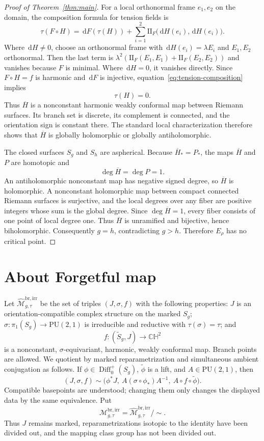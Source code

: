 \documentclass[12pt]{amsart}
\theoremstyle{remark}
\newcommand{\CH}{\mathbb{CH}}
\newcommand{\PU}{\mathrm{PU}}
\newcommand{\II}{\mathrm{II}}
\newcommand{\dd}{\,\mathrm d}
\begin{document}
\begin{proof}[Proof of Theorem~\ref{thm:main}]
For a local orthonormal frame $e_1,e_2$ on the domain, the composition
formula for tension fields is
\begin{equation}\label{eq:tension-composition}
 \tau(F\circ H)=\dd F(\tau(H))+
 \sum_{i=1}^2\II_F\bigl(\dd H(e_i),\dd H(e_i)\bigr).
\end{equation}
Where $\dd H\ne0$, choose an orthonormal frame with
$\dd H(e_i)=\lambda E_i$ and $E_1,E_2$ orthonormal.  Then the last term is
$\lambda^2(\II_F(E_1,E_1)+\II_F(E_2,E_2))$ and vanishes because $F$ is
minimal.  Where $\dd H=0$, it vanishes directly.  Since $F\circ H=f$ is
harmonic and $\dd F$ is injective, equation~\eqref{eq:tension-composition}
implies
\[
 \tau(H)=0.
\]
Thus $\overline H$ is a nonconstant harmonic weakly conformal map between
Riemann surfaces.  Its branch set is discrete, its complement is connected,
and the orientation sign is constant there.  The standard local
characterization therefore shows that $\overline H$ is globally holomorphic
or globally antiholomorphic.

The closed surfaces $S_g$ and $S_h$ are aspherical.  Because
$\overline H_*=P_*$, the maps $\overline H$ and $P$ are homotopic and
\[
 \deg\overline H=\deg P=1.
\]
An antiholomorphic nonconstant map has negative signed degree, so
$\overline H$ is holomorphic.  A nonconstant holomorphic map between compact
connected Riemann surfaces is surjective, and the local degrees over any
fiber are positive integers whose sum is the global degree.  Since
$\deg\overline H=1$, every fiber consists of one point of local degree one.
Thus $\overline H$ is unramified and bijective, hence biholomorphic.
Consequently $g=h$, contradicting $g>h$.  Therefore $E_\rho$ has no critical
point.
\end{proof}

\section{About Forgetful map}\label{rem:fractional-warning}
Let
$\widehat{\mathcal M}^{\mathrm{br,irr}}_{g,\tau}$ be the set of triples
$(J,\sigma,f)$ with the following properties: $J$ is an
orientation-compatible complex structure on the marked $S_g$;
$\sigma:\pi_1(S_g)\to\PU(2,1)$ is irreducible and reductive with
$\tau(\sigma)=\tau$; and
\[
 f:(\widetilde S_g,J)\longrightarrow\CH^2
\]
is a nonconstant, $\sigma$-equivariant, harmonic, weakly conformal map.
Branch points are allowed.  We quotient by marked reparametrization and
simultaneous ambient conjugation as follows.  If
$\phi\in\operatorname{Diff}_0^+(S_g)$, $\widetilde\phi$ is a lift, and
$A\in\PU(2,1)$, then
\begin{equation}\label{eq:minimal-moduli-equivalence}
 (J,\sigma,f)\sim
 \bigl(\phi^*J,\ A(\sigma\circ\phi_*)A^{-1},\
 A\circ f\circ\widetilde\phi\bigr).
\end{equation}
Compatible basepoints are understood; changing them only changes the displayed
data by the same equivalence.  Put
\[
 \mathcal M^{\mathrm{br,irr}}_{g,\tau}
 =\widehat{\mathcal M}^{\mathrm{br,irr}}_{g,\tau}/\!\sim.
\]
Thus $J$ remains marked, reparametrizations isotopic to the identity have been
divided out, and the mapping class group has not been divided out.
\end{document}
